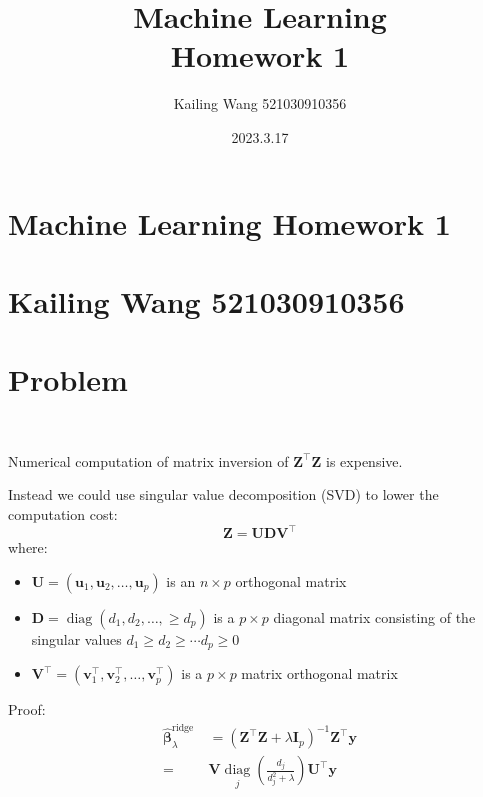 \documentclass[a4paper]{article}
\title{\Huge Machine Learning \\ \LARGE Homework 1}
\author{Kailing Wang 521030910356}
\date{2023.3.17}
\begin{document}
\section*{\Huge Machine Learning Homework 1}
\section*{\normalsize Kailing Wang 521030910356}
\section*{Problem}
~

Numerical computation of matrix inversion of $\mathbf{Z}^{\top} \mathbf{Z}$ is expensive.

Instead we could use singular value decomposition (SVD) to lower the computation cost:
$$
\mathbf{Z}=\mathbf{U D V}^{\top}
$$
where:
\begin{itemize}
\item $\mathbf{U}=\left(\mathbf{u}_1, \mathbf{u}_2, \ldots, \mathbf{u}_p\right)$ is an $n \times p$ orthogonal matrix
\item $\mathbf{D}=\operatorname{diag}\left(d_1, d_2, \ldots, \geq d_p\right)$ is a $p \times p$ diagonal matrix consisting of the singular values $d_1 \geq d_2 \geq \cdots d_p \geq 0$
\item $\mathbf{V}^{\top}=\left(\mathbf{v}_1^{\top}, \mathbf{v}_2^{\top}, \ldots, \mathbf{v}_p^{\top}\right)$ is a $p \times p$ matrix orthogonal matrix
\end{itemize}
Proof:
$$
\begin{aligned}
	\hat{\boldsymbol{\beta}}_\lambda^{\text {ridge }} & =\left(\mathbf{Z}^{\top} \mathbf{Z}+\lambda \mathbf{I}_p\right)^{-1} \mathbf{Z}^{\top} \mathbf{y} \\
	= & \mathbf{V}\underset{j}{\operatorname{diag}}\left(\frac{d_j}{d_j^2+\lambda}\right) \mathbf{U}^{\top} \mathbf{y}
\end{aligned}
$$
\end{document}

